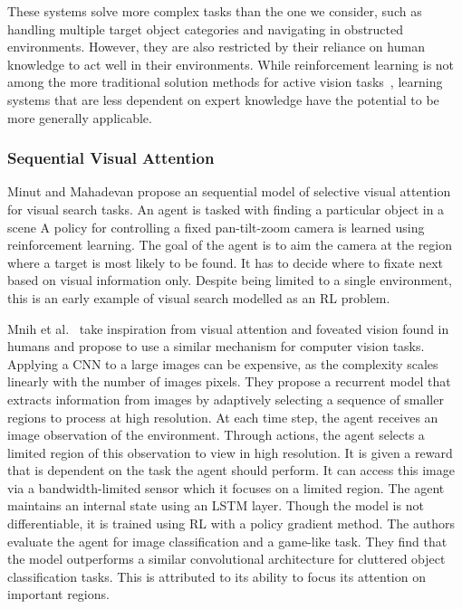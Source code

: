 These systems solve more complex tasks than the one we consider, such as handling multiple target object categories and navigating in obstructed environments.
However, they are also restricted by their reliance on human knowledge to act well in their environments.
While reinforcement learning is not among the more traditional solution methods for active vision tasks~\cite{chen_active_2011},
learning systems that are less dependent on expert knowledge have the potential to be more generally applicable.

\subsubsection{Sequential Visual Attention}

Minut and Mahadevan\cite{minut_reinforcement_2001} propose an sequential model of selective visual attention for visual search tasks.
An agent is tasked with finding a particular object in a scene
A policy for controlling a fixed pan-tilt-zoom camera is learned using reinforcement learning.
The goal of the agent is to aim the camera at the region where a target is most likely to be found.
It has to decide where to fixate next based on visual information only.
Despite being limited to a single environment, this is an early example of visual search modelled as an RL problem.

Mnih et al.~\cite{mnih_recurrent_2014} take inspiration from visual attention and foveated vision found in humans and propose to use a similar mechanism for computer vision tasks.
Applying a CNN to a large images can be expensive, as the complexity scales linearly with the number of images pixels.
They propose a recurrent model that extracts information from images by adaptively selecting a sequence of smaller regions to process at high resolution.
At each time step, the agent receives an image observation of the environment.
Through actions, the agent selects a limited region of this observation to view in high resolution.
It is given a reward that is dependent on the task the agent should perform.
It can access this image via a bandwidth-limited sensor which it focuses on a limited region.
The agent maintains an internal state using an LSTM layer.
Though the model is not differentiable, it is trained using RL with a policy gradient method.
The authors evaluate the agent for image classification and a game-like task.
They find that the model outperforms a similar convolutional architecture for cluttered object classification tasks.
This is attributed to its ability to focus its attention on important regions.


